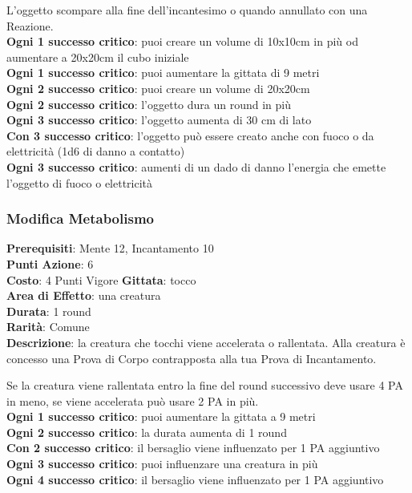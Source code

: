 \documentclass[12pt,a4paper,twoside,openany]{book}
\begin{document}
\begin{multicols}{2}
L'oggetto scompare alla fine dell'incantesimo o quando annullato con una Reazione.\\
\textbf{Ogni 1 successo critico}: puoi creare un volume di 10x10cm in più od aumentare a 20x20cm il cubo iniziale\\
\textbf{Ogni 1 successo critico}: puoi aumentare la gittata di 9 metri\\
\textbf{Ogni 2 successo critico}: puoi creare un volume di 20x20cm\\
\textbf{Ogni 2 successo critico}: l'oggetto dura un round in più\\
\textbf{Ogni 3 successo critico}: l'oggetto aumenta di 30 cm di lato\\
\textbf{Con 3 successo critico}: l'oggetto può essere creato anche con fuoco o da elettricità (1d6 di danno a contatto)\\
\textbf{Ogni 3 successo critico}: aumenti di un dado di danno l'energia che emette l'oggetto di fuoco o elettricità

\subsubsection*{Modifica Metabolismo}
\textbf{Prerequisiti}: Mente 12, Incantamento 10\\
\textbf{Punti Azione}: 6\\
\textbf{Costo}: 4 Punti Vigore
\textbf{Gittata}: tocco \\
\textbf{Area di Effetto}: una creatura\\
\textbf{Durata}: 1 round\\
\textbf{Rarità}: Comune\\
\textbf{Descrizione}: la creatura che tocchi viene accelerata o rallentata.
Alla creatura è concesso una Prova di Corpo contrapposta alla tua Prova di Incantamento.

Se la creatura viene rallentata entro la fine del round successivo deve usare 4 PA in meno, se viene accelerata può usare 2 PA in più.\\
\textbf{Ogni 1 successo critico}: puoi aumentare la gittata a 9 metri\\
\textbf{Ogni 2 successo critico}: la durata aumenta di 1 round\\
\textbf{Con 2 successo critico}: il bersaglio viene influenzato per 1 PA aggiuntivo\\
\textbf{Ogni 3 successo critico}: puoi influenzare una creatura in più\\
\textbf{Ogni 4 successo critico}: il bersaglio viene influenzato per 1 PA aggiuntivo


\end{multicols}
\end{document}
